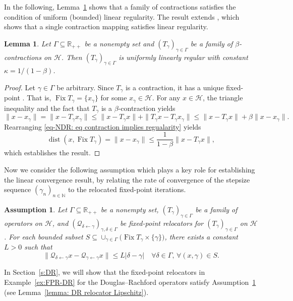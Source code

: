 \documentclass[a4paper,12pt]{article}
\newtheorem{lemma}[theorem]{Lemma}
\newtheorem{assumption}[theorem]{Assumption}
\DeclareMathOperator{\Fix}{Fix}
\DeclareMathOperator{\dist}{dist}
\begin{document}
In the following, Lemma~\ref{lemma: contraction implies regularity} shows that a family of contractions satisfies the condition of uniform (bounded) linear regularity. The result extends \cite[Lemma~5.5]{van2023bounding}, which shows that a single contraction mapping satisfies linear regularity.
\begin{lemma}\label{lemma: contraction implies regularity}
    Let $\Gamma\subseteq\mathbb{R}_{++}$ be a nonempty set and $(T_\gamma)_{\gamma\in\Gamma}$ be a family of $\beta$-contractions on $\mathcal{H}$. Then $(T_\gamma)_{\gamma\in\Gamma}$ is uniformly linearly regular with constant $\kappa=1/(1-\beta)$.
\end{lemma}
\begin{proof} 
Let $\gamma \in \Gamma$ be arbitrary. Since $T_\gamma$ is a contraction, it has a unique fixed-point  \cite[Theorem~1.50]{bauschke2017convex}. That is, $\Fix T_\gamma=\{x_\gamma\}$ for some $x_\gamma\in\mathcal{H}$. For any $x\in \mathcal{H}$, the triangle inequality and the fact that $T_\gamma$ is a $\beta$-contraction yields
\begin{equation}\label{eq-NDR: eq contraction implies regualarity}
        \|x-x_\gamma\|=\|x-T_\gamma x_\gamma\|
        \leq \|x-T_{\gamma}x\|+\|T_\gamma x-T_\gamma x_\gamma \|
        \leq \|x-T_\gamma x\|+\beta\|x-x_\gamma\|.   
\end{equation}
Rearranging \eqref{eq-NDR: eq contraction implies regualarity} yields
$$\dist(x,\Fix T_{\gamma})=\|x-x_\gamma\|\leq\frac{1}{1-\beta}\|x-T_\gamma x\|,$$
which establishes the result.
\end{proof}

Now we consider the following assumption which plays a key role for establishing the linear convergence result,  by relating the rate of convergence of the stepsize sequence $(\gamma_n)_{n \in \mathbb{N}}$ to the relocated fixed-point iterations.
\begin{assumption}\label{assumption: Q is Lipschitz depending on gamma}
    Let $\Gamma\subseteq\mathbb{R}_{++}$ be a nonempty set,  $(T_\gamma)_{\gamma\in\Gamma}$ be a family of operators on $\mathcal{H}$, and $(\mathcal{Q}_{\delta\leftarrow\gamma})_{\gamma,\delta\in\Gamma}$ be fixed-point relocators for $(T_\gamma)_{\gamma\in\Gamma}$ on $\mathcal{H}$. 
    For each bounded subset $S\subseteq\cup_{\gamma\in\Gamma}\bigl(\Fix T_\gamma\times \{\gamma\}\bigr)$,    
    there exists a constant $L>0$ such that 
    $$ \|\mathcal{Q}_{\delta\leftarrow\gamma}x-\mathcal{Q}_{\gamma\leftarrow\gamma}x\|\leq L|\delta-\gamma|\quad\forall \delta\in\Gamma,\,\forall (x,\gamma)\in S. $$
\end{assumption}
In Section~\ref{s:DR}, we will show that the fixed-point relocators in Example~\ref{ex:FPR-DR} for the Douglas--Rachford operators satisfy Assumption~\ref{assumption: Q is Lipschitz depending on gamma} (see Lemma~\ref{lemma: DR relocator Lipschitz}).
\end{document}
